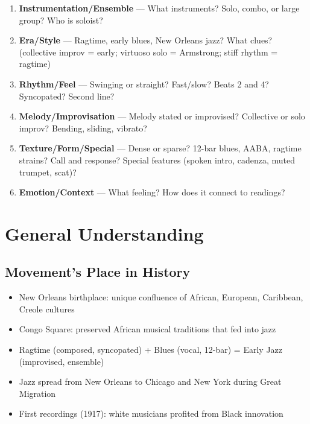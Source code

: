\documentclass[11pt, letterpaper]{article}
\begin{document}
\begin{enumerate}
    \item \textbf{Instrumentation/Ensemble} --- What instruments? Solo, combo, or large group? Who is soloist?
    \item \textbf{Era/Style} --- Ragtime, early blues, New Orleans jazz? What clues? (collective improv = early; virtuoso solo = Armstrong; stiff rhythm = ragtime)
    \item \textbf{Rhythm/Feel} --- Swinging or straight? Fast/slow? Beats 2 and 4? Syncopated? Second line?
    \item \textbf{Melody/Improvisation} --- Melody stated or improvised? Collective or solo improv? Bending, sliding, vibrato?
    \item \textbf{Texture/Form/Special} --- Dense or sparse? 12-bar blues, AABA, ragtime strains? Call and response? Special features (spoken intro, cadenza, muted trumpet, scat)?
    \item \textbf{Emotion/Context} --- What feeling? How does it connect to readings?
\end{enumerate}

\noindent{}

\section{General Understanding}

\subsection{Movement's Place in History}
\begin{itemize}
    \item New Orleans birthplace: unique confluence of African, European, Caribbean, Creole cultures
    \item Congo Square: preserved African musical traditions that fed into jazz
    \item Ragtime (composed, syncopated) + Blues (vocal, 12-bar) = Early Jazz (improvised, ensemble)
    \item Jazz spread from New Orleans to Chicago and New York during Great Migration
    \item First recordings (1917): white musicians profited from Black innovation
\end{itemize}
\end{document}
